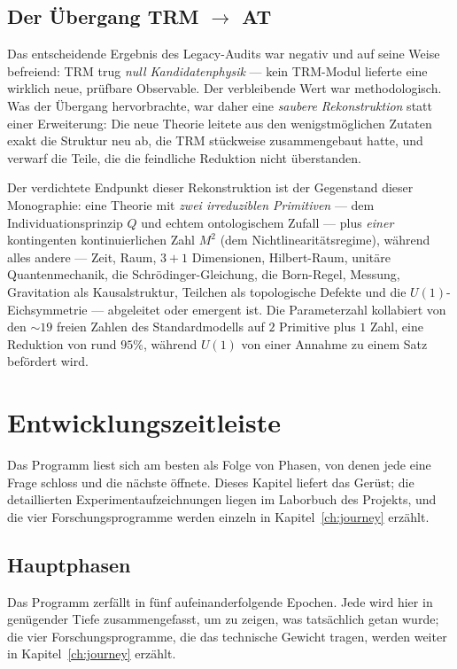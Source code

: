 \documentclass[10pt,twoside,openany]{book}
\begin{document}
\section{Der Übergang TRM $\to$ AT}

Das entscheidende Ergebnis des Legacy-Audits war negativ und auf seine Weise befreiend: TRM
trug \emph{null Kandidatenphysik} --- kein TRM-Modul lieferte eine wirklich neue, prüfbare
Observable. Der verbleibende Wert war methodologisch. Was der Übergang hervorbrachte, war
daher eine \emph{saubere Rekonstruktion} statt einer Erweiterung: Die neue Theorie leitete
aus den wenigstmöglichen Zutaten exakt die Struktur neu ab, die TRM stückweise
zusammengebaut hatte, und verwarf die Teile, die die feindliche Reduktion nicht überstanden.

Der verdichtete Endpunkt dieser Rekonstruktion ist der Gegenstand dieser Monographie: eine
Theorie mit \emph{zwei irreduziblen Primitiven} --- dem Individuationsprinzip $Q$ und echtem
ontologischem Zufall --- plus \emph{einer} kontingenten kontinuierlichen Zahl $M^2$ (dem
Nichtlinearitätsregime), während alles andere --- Zeit, Raum, $3{+}1$ Dimensionen,
Hilbert-Raum, unitäre Quantenmechanik, die Schr\"odinger-Gleichung, die Born-Regel, Messung,
Gravitation als Kausalstruktur, Teilchen als topologische Defekte und die
$U(1)$-Eichsymmetrie --- abgeleitet oder emergent ist. Die Parameterzahl kollabiert von den
$\sim19$ freien Zahlen des Standardmodells auf $2$ Primitive plus $1$ Zahl, eine Reduktion
von rund $95\%$, während $U(1)$ von einer Annahme zu einem Satz befördert wird.

\chapter{Entwicklungszeitleiste}
\label{ch:timeline}

Das Programm liest sich am besten als Folge von Phasen, von denen jede eine Frage schloss
und die nächste öffnete. Dieses Kapitel liefert das Gerüst; die detaillierten
Experimentaufzeichnungen liegen im Laborbuch des Projekts, und die vier
Forschungsprogramme werden einzeln in Kapitel~\ref{ch:journey} erzählt.

\section{Hauptphasen}

Das Programm zerfällt in fünf aufeinanderfolgende Epochen. Jede wird hier in genügender
Tiefe zusammengefasst, um zu zeigen, was tatsächlich getan wurde; die vier
Forschungsprogramme, die das technische Gewicht tragen, werden weiter in
Kapitel~\ref{ch:journey} erzählt.
\end{document}
